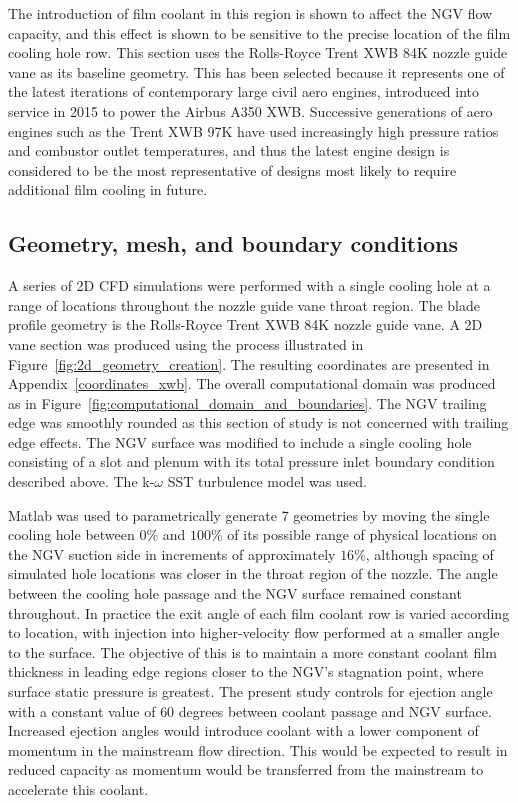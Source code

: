 \documentclass[a4paper, 11pt, oneside]{report}
\begin{document}
The introduction of film coolant in this region is shown to affect the NGV flow capacity, and this effect is shown to be sensitive to the precise location of the film cooling hole row. This section uses the Rolls-Royce Trent XWB 84K nozzle guide vane as its baseline geometry. This has been selected because it represents one of the latest iterations of contemporary large civil aero engines, introduced into service in 2015 to power the Airbus A350 XWB. Successive generations of aero engines such as the Trent XWB 97K have used increasingly high pressure ratios and combustor outlet temperatures, and thus the latest engine design is considered to be the most representative of designs most likely to require additional film cooling in future.

\subsection{Geometry, mesh, and boundary conditions}

A series of 2D CFD simulations were performed with a single cooling hole at a range of locations throughout the nozzle guide vane throat region. The blade profile geometry is the Rolls-Royce Trent XWB 84K nozzle guide vane. A 2D vane section was produced using the process illustrated in Figure~\ref{fig:2d_geometry_creation}. The resulting coordinates are presented in Appendix~\ref{coordinates_xwb}. The overall computational domain was produced as in Figure~\ref{fig:computational_domain_and_boundaries}. The NGV trailing edge was smoothly rounded as this section of study is not concerned with trailing edge effects. The NGV surface was modified to include a single cooling hole consisting of a slot and plenum with its total pressure inlet boundary condition described above. The k-$\omega$ SST turbulence model was used.

Matlab was used to parametrically generate 7 geometries by moving the single cooling hole between $0\%$ and $100\%$ of its possible range of physical locations on the NGV suction side in increments of approximately $16\%$, although spacing of simulated hole locations was closer in the throat region of the nozzle. The angle between the cooling hole passage and the NGV surface remained constant throughout. In practice the exit angle of each film coolant row is varied according to location, with injection into higher-velocity flow performed at a smaller angle to the surface. The objective of this is to maintain a more constant coolant film thickness in leading edge regions closer to the NGV's stagnation point, where surface static pressure is greatest. The present study controls for ejection angle with a constant value of $60$ degrees between coolant passage and NGV surface. Increased ejection angles would introduce coolant with a lower component of momentum in the mainstream flow direction. This would be expected to result in reduced capacity as momentum would be transferred from the mainstream to accelerate this coolant.
\end{document}
